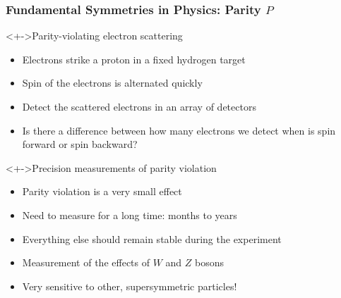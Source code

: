 \begin{frame}[t]
 \frametitle{Fundamental Symmetries in Physics: Parity $P$}
 \begin{block}<+->{Parity-violating electron scattering}
  \begin{itemize}
   \item Electrons strike a proton in a fixed hydrogen target
   \item \alert{Spin} of the electrons is \alert{alternated quickly}
   \item Detect the scattered electrons in an array of detectors
   \item Is there a difference between how many electrons we detect when is spin forward or spin backward?
  \end{itemize}
 \end{block}
 \begin{block}<+->{Precision measurements of parity violation}
  \begin{itemize}
   \item Parity violation is \alert{a very small effect}
   \item Need to measure for a long time: months to years
   \item Everything else should remain stable during the experiment
   \item \alert{Measurement of the effects of $W$ and $Z$ bosons}
   \item \alert{Very sensitive to other, supersymmetric particles!}
  \end{itemize}
 \end{block}
\end{frame}
